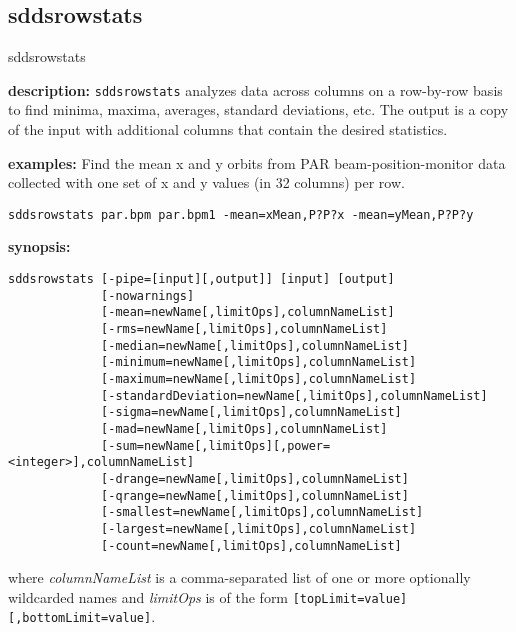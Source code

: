 \newpage
\subsection{sddsrowstats}
\label{sddsrowstats}

\begin{sddsprog}{sddsrowstats}
  \item \textbf{description:}
    \verb|sddsrowstats| analyzes data across columns on a row-by-row basis to
    find minima, maxima, averages, standard deviations, etc. The output is a
    copy of the input with additional columns that contain the desired
    statistics.

  \item \textbf{examples:}
    Find the mean x and y orbits from PAR beam-position-monitor data collected
    with one set of x and y values (in 32 columns) per row.
    \begin{verbatim}
sddsrowstats par.bpm par.bpm1 -mean=xMean,P?P?x -mean=yMean,P?P?y
    \end{verbatim}

  \item \textbf{synopsis:}
    \begin{verbatim}
sddsrowstats [-pipe=[input][,output]] [input] [output]
             [-nowarnings]
             [-mean=newName[,limitOps],columnNameList]
             [-rms=newName[,limitOps],columnNameList]
             [-median=newName[,limitOps],columnNameList]
             [-minimum=newName[,limitOps],columnNameList]
             [-maximum=newName[,limitOps],columnNameList]
             [-standardDeviation=newName[,limitOps],columnNameList]
             [-sigma=newName[,limitOps],columnNameList]
             [-mad=newName[,limitOps],columnNameList]
             [-sum=newName[,limitOps][,power=<integer>],columnNameList]
             [-drange=newName[,limitOps],columnNameList]
             [-qrange=newName[,limitOps],columnNameList]
             [-smallest=newName[,limitOps],columnNameList]
             [-largest=newName[,limitOps],columnNameList]
             [-count=newName[,limitOps],columnNameList]
    \end{verbatim}
    where \emph{columnNameList} is a comma-separated list of one or more
    optionally wildcarded names and \emph{limitOps} is of the form
    \verb|[topLimit=value][,bottomLimit=value]|.


\end{sddsprog}
